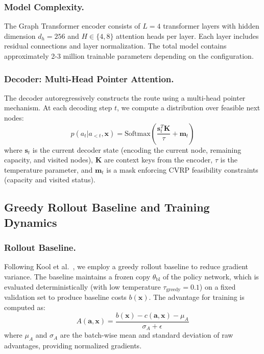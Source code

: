 \subsubsection{Model Complexity.}
The Graph Transformer encoder consists of $L = 4$ transformer layers with hidden dimension $d_h = 256$ and $H \in \{4, 8\}$ attention heads per layer. Each layer includes residual connections and layer normalization. The total model contains approximately 2-3 million trainable parameters depending on the configuration.

\subsubsection{Decoder: Multi-Head Pointer Attention.}
The decoder autoregressively constructs the route using a multi-head pointer mechanism. At each decoding step $t$, we compute a distribution over feasible next nodes:
\begin{equation}
p(a_t | a_{<t}, \mathbf{x}) = \text{Softmax}\left(\frac{\mathbf{s}_t^T \mathbf{K}}{\tau} + \mathbf{m}_t\right)
\end{equation}
where $\mathbf{s}_t$ is the current decoder state (encoding the current node, remaining capacity, and visited nodes), $\mathbf{K}$ are context keys from the encoder, $\tau$ is the temperature parameter, and $\mathbf{m}_t$ is a mask enforcing CVRP feasibility constraints (capacity and visited status).

\subsection{Greedy Rollout Baseline and Training Dynamics}
\label{sec:baseline}

\subsubsection{Rollout Baseline.}
Following Kool et al.~\cite{kool2018attention}, we employ a greedy rollout baseline to reduce gradient variance. The baseline maintains a frozen copy $\theta_{\text{bl}}$ of the policy network, which is evaluated deterministically (with low temperature $\tau_{\text{greedy}} = 0.1$) on a fixed validation set to produce baseline costs $b(\mathbf{x})$. The advantage for training is computed as:
\begin{equation}
A(\mathbf{a}, \mathbf{x}) = \frac{b(\mathbf{x}) - c(\mathbf{a}, \mathbf{x}) - \mu_A}{\sigma_A + \epsilon}
\end{equation}
where $\mu_A$ and $\sigma_A$ are the batch-wise mean and standard deviation of raw advantages, providing normalized gradients.

